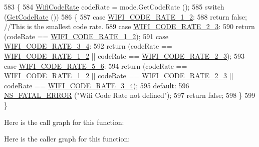 \begin{DoxyCode}
583 \{
584   \hyperlink{namespacens3_aeaf3a86fd4bdb7829955238fba43e2ad}{WifiCodeRate} codeRate = mode.GetCodeRate ();
585   \textcolor{keywordflow}{switch} (\hyperlink{classns3_1_1WifiMode_a41fcb1abd2aa488145f2f43ca9ba8e1d}{GetCodeRate} ())
586     \{
587     \textcolor{keywordflow}{case} \hyperlink{namespacens3_aeaf3a86fd4bdb7829955238fba43e2ada66dfa017f6a74bcb72cdccfee778e90b}{WIFI\_CODE\_RATE\_1\_2}:
588       \textcolor{keywordflow}{return} \textcolor{keyword}{false}; \textcolor{comment}{//This is the smallest code rate.}
589     \textcolor{keywordflow}{case} \hyperlink{namespacens3_aeaf3a86fd4bdb7829955238fba43e2ada161e88df840a9d1ed66f6f8edd0d6415}{WIFI\_CODE\_RATE\_2\_3}:
590       \textcolor{keywordflow}{return} (codeRate == \hyperlink{namespacens3_aeaf3a86fd4bdb7829955238fba43e2ada66dfa017f6a74bcb72cdccfee778e90b}{WIFI\_CODE\_RATE\_1\_2});
591     \textcolor{keywordflow}{case} \hyperlink{namespacens3_aeaf3a86fd4bdb7829955238fba43e2ada705b2eb134214c4f87c2b07dfb59046a}{WIFI\_CODE\_RATE\_3\_4}:
592       \textcolor{keywordflow}{return} (codeRate == \hyperlink{namespacens3_aeaf3a86fd4bdb7829955238fba43e2ada66dfa017f6a74bcb72cdccfee778e90b}{WIFI\_CODE\_RATE\_1\_2} || codeRate == 
      \hyperlink{namespacens3_aeaf3a86fd4bdb7829955238fba43e2ada161e88df840a9d1ed66f6f8edd0d6415}{WIFI\_CODE\_RATE\_2\_3});
593     \textcolor{keywordflow}{case} \hyperlink{namespacens3_aeaf3a86fd4bdb7829955238fba43e2adaf0309d61b4cf97e5718f6d3b9fdba3aa}{WIFI\_CODE\_RATE\_5\_6}:
594       \textcolor{keywordflow}{return} (codeRate == \hyperlink{namespacens3_aeaf3a86fd4bdb7829955238fba43e2ada66dfa017f6a74bcb72cdccfee778e90b}{WIFI\_CODE\_RATE\_1\_2} || codeRate == 
      \hyperlink{namespacens3_aeaf3a86fd4bdb7829955238fba43e2ada161e88df840a9d1ed66f6f8edd0d6415}{WIFI\_CODE\_RATE\_2\_3} || codeRate == \hyperlink{namespacens3_aeaf3a86fd4bdb7829955238fba43e2ada705b2eb134214c4f87c2b07dfb59046a}{WIFI\_CODE\_RATE\_3\_4});
595     \textcolor{keywordflow}{default}:
596       \hyperlink{group__fatal_ga5131d5e3f75d7d4cbfd706ac456fdc85}{NS\_FATAL\_ERROR} (\textcolor{stringliteral}{"Wifi Code Rate not defined"});
597       \textcolor{keywordflow}{return} \textcolor{keyword}{false};
598     \}
599 \}
\end{DoxyCode}


Here is the call graph for this function\+:




Here is the caller graph for this function\+:


